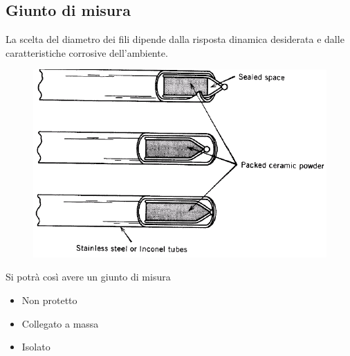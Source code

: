 \documentclass[a4paper, 15pt]{article}
\begin{document}
\subsection{Giunto di misura}
\begin{adjustwidth}{2in}{}	  
	La scelta del diametro dei fili dipende dalla risposta dinamica desiderata e dalle caratteristiche corrosive dell'ambiente. 
	\begin{figure}[H]
		\centering
		\includegraphics[width=0.5\linewidth]{immagini/screenshot031}
		\label{fig:screenshot031}
	\end{figure}
	Si potrà così avere un giunto di misura
	\begin{itemize}
		\item Non protetto
		\item Collegato a massa
		\item Isolato
	\end{itemize}
\end{adjustwidth}
\end{document}
